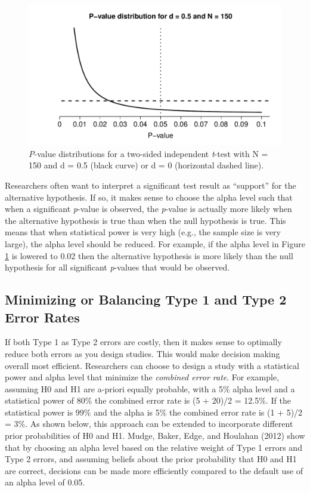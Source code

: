 \documentclass[,jou,floatsintext]{apa6}
\begin{document}
\begin{figure}
\centering
\includegraphics{Justify_in_Practice_files/figure-latex/p-plot-1.pdf}
\caption{\label{fig:p-plot}\emph{P}-value distributions for a two-sided independent \emph{t}-test with N = 150 and d = 0.5 (black curve) or d = 0 (horizontal dashed line).}
\end{figure}

Researchers often want to interpret a significant test result as \enquote{support} for the alternative hypothesis. If so, it makes sense to choose the alpha level such that when a significant \emph{p}-value is observed, the \emph{p}-value is actually more likely when the alternative hypothesis is true than when the null hypothesis is true. This means that when statistical power is very high (e.g., the sample size is very large), the alpha level should be reduced. For example, if the alpha level in Figure \ref{fig:p-plot} is lowered to 0.02 then the alternative hypothesis is more likely than the null hypothesis for all significant \emph{p}-values that would be observed.

\hypertarget{minimizing-or-balancing-type-1-and-type-2-error-rates}{%
\subsection{Minimizing or Balancing Type 1 and Type 2 Error Rates}\label{minimizing-or-balancing-type-1-and-type-2-error-rates}}

If both Type 1 as Type 2 errors are costly, then it makes sense to optimally reduce both errors as you design studies. This would make decision making overall most efficient. Researchers can choose to design a study with a statistical power and alpha level that minimize the \emph{combined error rate}. For example, assuming H0 and H1 are a-priori equally probable, with a 5\% alpha level and a statistical power of 80\% the combined error rate is (5 + 20)/2 = 12.5\%. If the statistical power is 99\% and the alpha is 5\% the combined error rate is (1 + 5)/2 = 3\%. As shown below, this approach can be extended to incorporate different prior probabilities of H0 and H1. Mudge, Baker, Edge, and Houlahan (2012) show that by choosing an alpha level based on the relative weight of Type 1 errors and Type 2 errors, and assuming beliefs about the prior probability that H0 and H1 are correct, decisions can be made more efficiently compared to the default use of an alpha level of 0.05.
\end{document}
